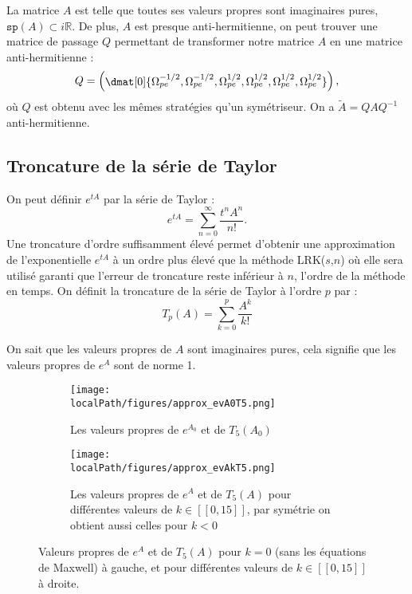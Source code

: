 La matrice $A$ est telle que toutes ses valeurs propres sont imaginaires pures, $\texttt{sp}(A)\subset i\mathbb{R}$. De plus, $A$ est presque anti-hermitienne, on peut trouver une matrice de passage $Q$ permettant de transformer notre matrice $A$ en une matrice anti-hermitienne :
$$
  Q = 
  \begin{pmatrix}
    \dmat[0]{\Omega_{pe}^{-1/2},\Omega_{pe}^{-1/2},\Omega_{pe}^{1/2},\Omega_{pe}^{1/2},\Omega_{pe}^{1/2},\Omega_{pe}^{1/2}}
  \end{pmatrix},
$$
où $Q$ est obtenu avec les mêmes stratégies qu'un symétriseur. On a $\tilde{A}=QAQ^{-1}$ anti-hermitienne.


\subsection{Troncature de la série de Taylor}

On peut définir $e^{tA}$ par la série de Taylor :
$$
  e^{tA} = \sum_{n=0}^\infty \frac{t^nA^n}{n!}.
$$
Une troncature d'ordre suffisamment élevé permet d'obtenir une approximation de l'exponentielle $e^{tA}$ à un ordre plus élevé que la méthode LRK($s$,$n$) où elle sera utilisé garanti que l'erreur de troncature reste inférieur à $n$, l'ordre de la méthode en temps. On définit la troncature de la série de Taylor à l'ordre $p$ par :
$$
  T_p(A) = \sum_{k=0}^p \frac{A^k}{k!}
$$

On sait que les valeurs propres de $A$ sont imaginaires pures, cela signifie que les valeurs propres de $e^{A}$ sont de norme 1.

\begin{figure}
  \begin{subfigure}{.5\textwidth}
    \centering
    \texttt{[image: \\localPath/figures/approx\_evA0T5.png]}
    \caption{Les valeurs propres de $e^{A_0}$ et de $T_5(A_0)$}
  \end{subfigure}
  \begin{subfigure}{.5\textwidth}
    \centering
    \texttt{[image: \\localPath/figures/approx\_evAkT5.png]}
    \caption{Les valeurs propres de $e^{A}$ et de $T_5(A)$ pour différentes valeurs de $k\in[\![0,15]\!]$, par symétrie on obtient aussi celles pour $k<0$}
  \end{subfigure}
  \caption{Valeurs propres de $e^{A}$ et de $T_5(A)$ pour $k=0$ (sans les équations de Maxwell) à gauche, et pour différentes valeurs de $k\in[\![0,15]\!]$ à droite.}
\end{figure}

